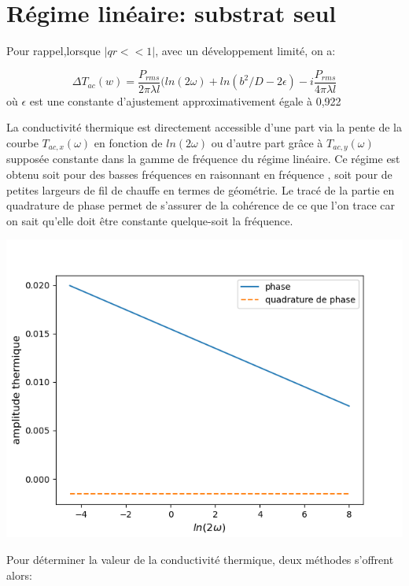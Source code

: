 \documentclass[10pt,a4paper]{report}
\begin{document}
\section{Régime linéaire: substrat seul}
Pour rappel,lorsque $\lvert qr<<1 \rvert$, avec un développement limité, on a:
\begin{center}
\begin{equation}
\Delta T_{ac}(w)=\frac{P_{rms}}{2\pi\lambda l}(ln(2\omega)+ln(b^2/D-2\epsilon)-i\frac{P_{rms}}{4\pi\lambda l}
\end{equation}
où $\epsilon$ est une constante d'ajustement approximativement égale à 0,922
\end{center}
La conductivité thermique est directement accessible d'une part via la pente de la courbe $T_{ac,x}(\omega)$ en fonction de $ln(2\omega)$ ou d'autre part grâce à $T_{ac,y}(\omega)$ supposée constante dans la gamme de fréquence du régime linéaire. Ce régime est obtenu soit pour des basses fréquences en raisonnant en fréquence , soit pour de petites largeurs de fil de chauffe en termes de géométrie.
\newline
\newline
Le tracé de la partie en quadrature de phase permet de s'assurer de la cohérence de ce que l'on trace car on sait qu'elle doit être constante quelque-soit la fréquence.
\begin{center}
\includegraphics[scale=0.6]{../schéma et graphes/graphe_linéaire.png} 
\end{center}
Pour déterminer la valeur de la conductivité thermique, deux méthodes s'offrent alors:
\end{document}
